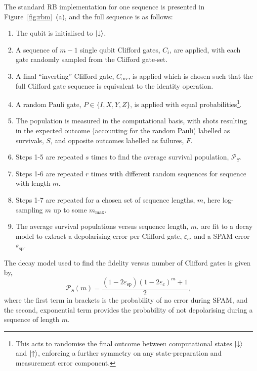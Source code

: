     The standard RB implementation for one sequence is presented in Figure~\ref{fig:rbm}~(a), and the full sequence is as follows:
    \begin{enumerate}
        \item The qubit is initialised to $\ket{\downarrow}$. 
        \item A sequence of $m-1$ single qubit Clifford gates, $C_i$, are applied, with each gate randomly sampled from the Clifford gate-set. 
        \item A final ``inverting'' Clifford gate, $C_\mathrm{inv}$, is applied which is chosen such that the full Clifford gate sequence is equivalent to the identity operation.
        \item A random Pauli gate, $P\in\{I,X,Y,Z\}$, is applied
        with equal probabilities\footnote{This acts to randomise the final outcome between
        computational states $\ket{\downarrow}$ and $\ket{\uparrow}$, enforcing a further symmetry
        on any state-preparation and measurement error component.}.
        \item The population is measured in the computational basis, with shots resulting in the expected outcome (accounting for the random Pauli) labelled as survivals, $S$, and opposite outcomes labelled as failures, $F$.
        \item Steps 1-5 are repeated $s$ times to find the average survival population, $\mathcal{P}_S$.
        \item Steps 1-6 are repeated $r$ times with different random sequences for sequence with length $m$. 
        \item Steps 1-7 are repeated for a chosen set of sequence lengths, $m$, here log-sampling $m$ up to some $m_\mathrm{max}$.
        \item The average survival populations versus sequence length, $m$, are fit to a decay model to extract a depolarising error per Clifford gate, $\varepsilon_c$, and a SPAM error $\varepsilon_\mathrm{sp}$.
    \end{enumerate}
    The decay model used to find the fidelity versus number of Clifford gates is given by,
    \begin{equation}
    \label{eq:RBM_decay}
        \mathcal{P}_S(m) = \frac{(1 - 2 \varepsilon_\mathrm{sp}) (1 - 2\varepsilon_c)^m + 1}{2},
    \end{equation}
    where the first term in brackets is the probability of no error during SPAM, and the second, exponential term provides the probability of not depolarising during a sequence of length $m$.\\

